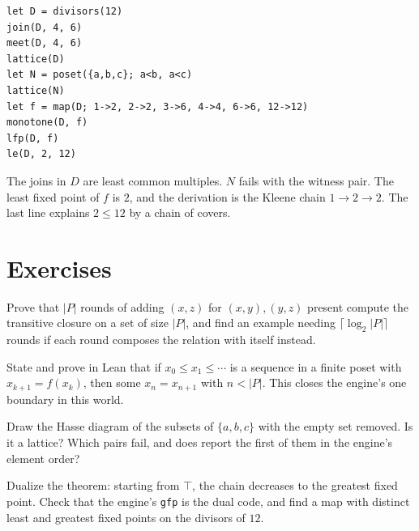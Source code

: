 \begin{trybox}
\begin{verbatim}
let D = divisors(12)
join(D, 4, 6)
meet(D, 4, 6)
lattice(D)
let N = poset({a,b,c}; a<b, a<c)
lattice(N)
let f = map(D; 1->2, 2->2, 3->6, 4->4, 6->6, 12->12)
monotone(D, f)
lfp(D, f)
le(D, 2, 12)
\end{verbatim}
  The joins in $D$ are least common multiples. $N$ fails with the witness pair. The least
  fixed point of $f$ is $2$, and the derivation is the Kleene chain $1 \to 2 \to 2$. The last
  line explains $2 \le 12$ by a chain of covers.
\end{trybox}

\section{Exercises}

\begin{exercisebox}[Closure]
  Prove that $|P|$ rounds of adding $(x, z)$ for $(x, y), (y, z)$ present compute the
  transitive closure on a set of size $|P|$, and find an example needing $\lceil \log_2 |P|
  \rceil$ rounds if each round composes the relation with itself instead.
\end{exercisebox}

\begin{exercisebox}
  State and prove in Lean that if $x_0 \le x_1 \le \cdots$ is a sequence in a finite poset with
  $x_{k+1} = f(x_k)$, then some $x_n = x_{n+1}$ with $n < |P|$. This closes the engine's one
  boundary in this world.
\end{exercisebox}

\begin{exercisebox}
  Draw the Hasse diagram of the subsets of $\{a, b, c\}$ with the empty set removed. Is it a
  lattice? Which pairs fail, and does  report the first of them in the
  engine's element order?
\end{exercisebox}

\begin{exercisebox}
  Dualize the theorem: starting from $\top$, the chain decreases to the greatest fixed point.
  Check that the engine's \texttt{gfp} is the dual code, and find a map with distinct least and
  greatest fixed points on the divisors of $12$.
\end{exercisebox}
